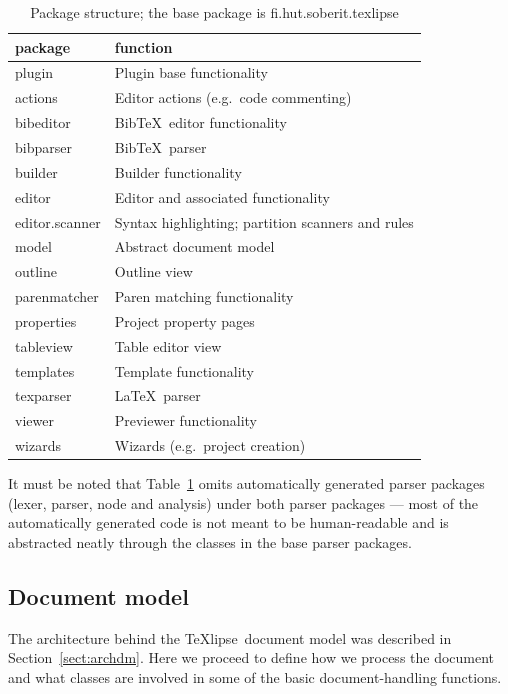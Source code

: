 \documentclass[a4paper,11pt,twoside]{article}
\newcommand{\texlipse}{\TeX lipse}
\begin{document}
\begin{table}[!htpb]
\begin{center}
\begin{tabular}{lp{10cm}}
package & function \\
\midrule
plugin & Plugin base functionality\\
actions & Editor actions (e.g.\ code commenting)\\
bibeditor & Bib\TeX\ editor functionality\\
bibparser & Bib\TeX\ parser\\
builder & Builder functionality\\
editor & Editor and associated functionality\\
editor.scanner & Syntax highlighting; partition scanners and rules\\
model & Abstract document model\\
outline & Outline view\\
parenmatcher & Paren matching functionality\\
properties & Project property pages\\
tableview & Table editor view\\
templates & Template functionality\\
texparser & \LaTeX\ parser\\
viewer & Previewer functionality\\
wizards & Wizards (e.g.\ project creation)\\
\end{tabular}
\end{center}
\caption{Package structure; the base package is fi.hut.soberit.texlipse}
\label{tbl:pkg}
\end{table}

It must be noted that Table~\ref{tbl:pkg} omits automatically generated parser 
packages (lexer, parser, node and analysis) under both parser packages --- most 
of the automatically generated code is not meant to be human-readable and is 
abstracted neatly through the classes in the base parser packages.


\subsection{Document model}

The architecture behind the \texlipse\ document model was described in 
Section~\ref{sect:archdm}. Here we proceed to define how we process the 
document and what classes are involved in some of the basic document-handling 
functions.
\end{document}
